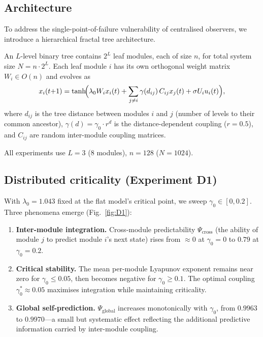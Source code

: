 \documentclass[11pt,a4paper]{article}
\begin{document}
\subsection{Architecture}

To address the single-point-of-failure vulnerability of centralised
observers, we introduce a hierarchical fractal tree architecture.

An $L$-level binary tree contains $2^L$ leaf modules, each of size $n$,
for total system size $N = n \cdot 2^L$. Each leaf module $i$ has its
own orthogonal weight matrix $W_i \in O(n)$ and evolves as
\begin{equation}
  x_i(t{+}1) = \tanh\!\Bigl(\lambda_0 W_i x_i(t)
  + \sum_{j \neq i} \gamma(d_{ij})\, C_{ij} x_j(t)
  + \sigma U_i u_i(t)\Bigr),
  \label{eq:fractal}
\end{equation}
where $d_{ij}$ is the tree distance between modules $i$ and $j$
(number of levels to their common ancestor),
$\gamma(d) = \gamma_0 \cdot r^d$ is the distance-dependent coupling
($r = 0.5$), and $C_{ij}$ are random inter-module coupling matrices.

All experiments use $L = 3$ (8 modules), $n = 128$ ($N = 1024$).

\subsection{Distributed criticality (Experiment D1)}

With $\lambda_0 = 1.043$ fixed at the flat model's critical point, we
sweep $\gamma_0 \in [0, 0.2]$. Three phenomena emerge
(Fig.~\ref{fig:D1}):

\begin{enumerate}
\item \textbf{Inter-module integration.} Cross-module predictability
$\Psi_{\mathrm{cross}}$ (the ability of module $j$ to predict module
$i$'s next state) rises from $\approx 0$ at $\gamma_0 = 0$ to $0.79$
at $\gamma_0 = 0.2$.
\item \textbf{Critical stability.} The mean per-module Lyapunov exponent
remains near zero for $\gamma_0 \leq 0.05$, then becomes negative for
$\gamma_0 \geq 0.1$. The optimal coupling $\gamma_0^* \approx 0.05$
maximises integration while maintaining criticality.
\item \textbf{Global self-prediction.} $\Psi_{\mathrm{global}}$
increases monotonically with $\gamma_0$, from $0.9963$ to $0.9970$---a
small but systematic effect reflecting the additional predictive
information carried by inter-module coupling.
\end{enumerate}
\end{document}
